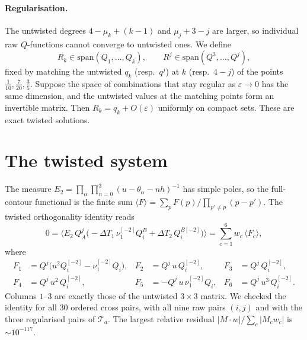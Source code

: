 \documentclass[11pt]{article}
\newcommand{\sh}[1]{^{[#1]}}
\newcommand{\br}[1]{\langle #1\rangle}
\begin{document}
\paragraph{Regularisation.} The untwisted degrees $4-\mu_k+(k-1)$ and $\mu_j+3-j$ are larger,
so individual raw $Q$-functions cannot converge to untwisted ones. We define
\begin{equation}
R_k\in\mathrm{span}(Q_1,\dots,Q_k),\qquad R^j\in\mathrm{span}(Q^3,\dots,Q^j),
\end{equation}
fixed by matching the untwisted $q_k$ (resp.\ $q^j$) at $k$ (resp.\ $4-j$) of the points
$\tfrac1{10},\tfrac7{20},\tfrac35$. Suppose the space of combinations that stay regular as
$\varepsilon\to0$ has the same dimension, and the untwisted values at the matching points form an
invertible matrix. Then $R_k=q_k+O(\varepsilon)$ uniformly on compact sets. These are exact twisted
solutions.

\section{The twisted system}

The measure $E_2=\prod_\alpha\prod_{n=0}^{3}(u-\theta_\alpha-nh)^{-1}$ has simple poles, so the
full-contour functional is the finite sum
$\br{F}=\sum_p F(p)\big/\prod_{p'\neq p}(p-p')$. The twisted orthogonality identity reads
\begin{equation}
0=\br{E_2\,Q^j_A\big(-\Delta T_1\,\nu_1\sh{-2}Q_i^B+\Delta T_2\,Q_i^{B[-2]}\big)}=\sum_{c=1}^6w_c\,\br{F_c},
\end{equation}
where
\begin{equation}
\begin{aligned}
F_1&=Q^j\big(u^2Q_i\sh{-2}-\nu_1\sh{-2}Q_i\big), & F_2&=Q^j\,u\,Q_i\sh{-2}, & F_3&=Q^j\,Q_i\sh{-2},\\
F_4&=Q^j\,u^2\,Q_i\sh{-2}, & F_5&=-Q^j\,u\,\nu_1\sh{-2}Q_i, & F_6&=Q^j\,u^3\,Q_i\sh{-2}.
\end{aligned}
\end{equation}
Columns $1$--$3$ are exactly those of the untwisted $3\times3$ matrix. We checked the identity for
all $30$ ordered cross pairs, with all nine raw pairs $(i,j)$ and with the three regularised pairs
of $\mathcal T_a$. The largest relative residual $|M\cdot w|/\sum_c|M_cw_c|$ is $\sim10^{-117}$.
\end{document}
